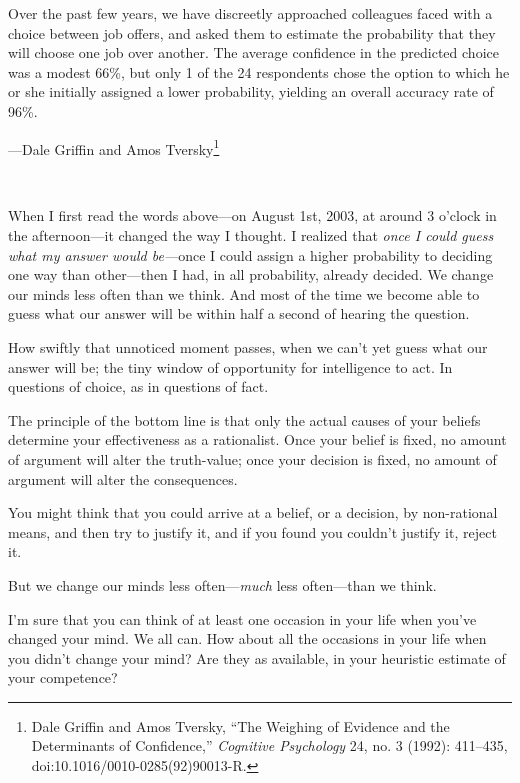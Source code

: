 \myendsectiontext


{
 Over the past few years, we have discreetly approached colleagues
faced with a choice between job offers, and asked them to estimate the
probability that they will choose one job over another. The average
confidence in the predicted choice was a modest 66\%, but only 1 of the
24 respondents chose the option to which he or she initially assigned a
lower probability, yielding an overall accuracy rate of 96\%.}

{\raggedleft
 {}---Dale Griffin and Amos Tversky\footnote{Dale Griffin and Amos Tversky, ``The Weighing
of Evidence and the Determinants of Confidence,''
\textit{Cognitive Psychology} 24, no. 3 (1992): 411--435,
doi:10.1016/0010-0285(92)90013-R.}
\par}


\bigskip

{
 ~}

{
 When I first read the words above---on August 1st, 2003, at around
3 o'clock in the afternoon---it changed the way I
thought. I realized that \textit{once I could guess what my answer
would be---}once I could assign a higher probability to deciding one
way than other---then I had, in all probability, already decided. We
change our minds less often than we think. And most of the time we
become able to guess what our answer will be within half a second of
hearing the question.}

{
 How swiftly that unnoticed moment passes, when we
can't yet guess what our answer will be; the tiny
window of opportunity for intelligence to act. In questions of choice,
as in questions of fact.}

{
 The principle of the bottom line is that only the actual causes of
your beliefs determine your effectiveness as a rationalist. Once your
belief is fixed, no amount of argument will alter the truth-value; once
your decision is fixed, no amount of argument will alter the
consequences.}

{
 You might think that you could arrive at a belief, or a decision,
by non-rational means, and then try to justify it, and if you found you
couldn't justify it, reject it.}

{
 But we change our minds less often---\textit{much} less
often---than we think.}

{
 I'm sure that you can think of at least one
occasion in your life when you've changed your mind. We
all can. How about all the occasions in your life when you
didn't change your mind? Are they as available, in your
heuristic estimate of your competence?}

